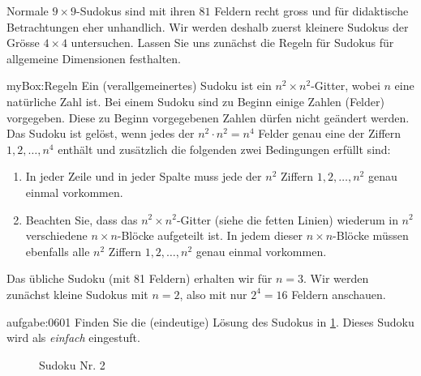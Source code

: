 \noindent
Normale $9\times 9$-Sudokus sind mit ihren $81$ Feldern recht gross und für didaktische Betrachtungen eher unhandlich. Wir werden deshalb zuerst kleinere Sudokus der Grösse $4\times 4$ untersuchen. Lassen Sie uns zunächst die Regeln für Sudokus für allgemeine Dimensionen festhalten.
\begin{myBox}{myBox:Regeln}
Ein (verallgemeinertes) Sudoku ist ein $n^2 \times n^2$-Gitter, wobei $n$ eine natürliche Zahl ist. Bei einem Sudoku sind zu Beginn einige Zahlen (Felder) vorgegeben. Diese zu Beginn vorgegebenen Zahlen dürfen nicht geändert werden. Das Sudoku ist gelöst, wenn jedes der $n^2\cdot n^2 = n^4$ Felder genau eine der Ziffern $1,2,\ldots, n^4$ enthält und zusätzlich die folgenden zwei Bedingungen erfüllt sind:
    \begin{enumerate}
    \item In jeder Zeile und in jeder Spalte muss jede der $n^2$ Ziffern $1,2,\ldots, n^2$ genau einmal vorkommen.
    \item Beachten Sie, dass das $n^2\times n^2$-Gitter (siehe die fetten Linien) wiederum in $n^2$ verschiedene $n\times n$-Blöcke aufgeteilt ist. In jedem dieser $n\times n$-Blöcke müssen ebenfalls alle $n^2$ Ziffern $1,2,\ldots, n^2$ genau einmal vorkommen.
\end{enumerate}
\end{myBox}
Das übliche Sudoku (mit 81 Feldern) erhalten wir für $n=3$. Wir werden zunächst kleine Sudokus mit $n=2$, also mit nur $2^4 = 16$ Feldern anschauen.

\begin{aufgabe}{aufgabe:0601}
  Finden Sie die (eindeutige) Lösung des Sudokus in \cref{fig:sudoku2}. Dieses Sudoku wird als \textit{einfach} eingestuft.
  \begin{figure}[H]
      \centering
      \caption{Sudoku Nr. 2}
      \label{fig:sudoku2}
  \end{figure}
  \end{aufgabe}
  

